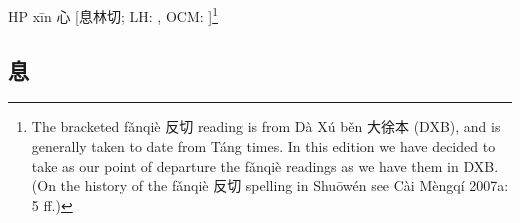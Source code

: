 




HP   xīn 心 [息林切; LH: {}, OCM: {}]\footnote{The bracketed fǎnqiè 反切 reading is from Dà Xú běn 大徐本 (DXB), and is generally taken to date from Táng times. In this edition we have decided to take as our point of departure the fǎnqiè readings as we have them in DXB. (On the history of the fǎnqiè 反切 spelling in Shuōwén see Cài Mèngqí 2007a: 5 ff.)}
 

\subsection{息}



